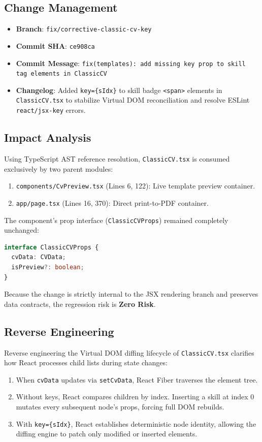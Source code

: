 \documentclass[12pt,a4paper]{article}
\begin{document}
\subsection{Change Management}
\begin{itemize}[noitemsep]
    \item \textbf{Branch}: \texttt{fix/corrective-classic-cv-key}
    \item \textbf{Commit SHA}: \texttt{ce908ca}
    \item \textbf{Commit Message}: \texttt{fix(templates): add missing key prop to skill tag elements in ClassicCV}
    \item \textbf{Changelog}: Added \texttt{key=\{sIdx\}} to skill badge \texttt{<span>} elements in \texttt{ClassicCV.tsx} to stabilize Virtual DOM reconciliation and resolve ESLint \texttt{react/jsx-key} errors.
\end{itemize}

\subsection{Impact Analysis}
Using TypeScript AST reference resolution, \texttt{ClassicCV.tsx} is consumed exclusively by two parent modules:
\begin{enumerate}[noitemsep]
    \item \texttt{components/CvPreview.tsx} (Lines 6, 122): Live template preview container.
    \item \texttt{app/page.tsx} (Lines 16, 370): Direct print-to-PDF container.
\end{enumerate}
The component's prop interface (\texttt{ClassicCVProps}) remained completely unchanged:
\begin{lstlisting}[language=TypeScript]
interface ClassicCVProps {
  cvData: CVData;
  isPreview?: boolean;
}
\end{lstlisting}
Because the change is strictly internal to the JSX rendering branch and preserves data contracts, the regression risk is \textbf{Zero Risk}.

\subsection{Reverse Engineering}
Reverse engineering the Virtual DOM diffing lifecycle of \texttt{ClassicCV.tsx} clarifies how React processes child lists during state changes:
\begin{enumerate}[noitemsep]
    \item When \texttt{cvData} updates via \texttt{setCvData}, React Fiber traverses the element tree.
    \item Without keys, React compares children by index. Inserting a skill at index 0 mutates every subsequent node's props, forcing full DOM rebuilds.
    \item With \texttt{key=\{sIdx\}}, React establishes deterministic node identity, allowing the diffing engine to patch only modified or inserted elements.
\end{enumerate}
\end{document}
